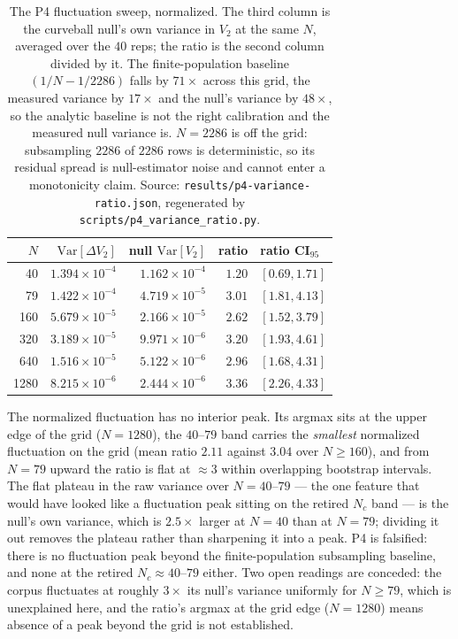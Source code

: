 \documentclass[11pt,a4paper]{article}
\theoremstyle{plain}
\theoremstyle{remark}
\theoremstyle{plain}
\begin{document}
\begin{table}[h]\centering\small
\begin{tabular}{rrrrl}
\toprule
$N$ & $\mathrm{Var}[\Delta V_2]$ & null $\mathrm{Var}[V_2]$ & ratio & ratio CI$_{95}$ \\
\midrule
40   & $1.394\times10^{-4}$ & $1.162\times10^{-4}$ & $1.20$ & $[0.69,1.71]$ \\
79   & $1.422\times10^{-4}$ & $4.719\times10^{-5}$ & $3.01$ & $[1.81,4.13]$ \\
160  & $5.679\times10^{-5}$ & $2.166\times10^{-5}$ & $2.62$ & $[1.52,3.79]$ \\
320  & $3.189\times10^{-5}$ & $9.971\times10^{-6}$ & $3.20$ & $[1.93,4.61]$ \\
640  & $1.516\times10^{-5}$ & $5.122\times10^{-6}$ & $2.96$ & $[1.68,4.31]$ \\
1280 & $8.215\times10^{-6}$ & $2.444\times10^{-6}$ & $3.36$ & $[2.26,4.33]$ \\
\bottomrule
\end{tabular}
\caption{The P4 fluctuation sweep, normalized. The third column is the curveball
null's own variance in $V_2$ at the same $N$, averaged over the $40$ reps; the
ratio is the second column divided by it. The finite-population baseline
$(1/N-1/2286)$ falls by $71\times$ across this grid, the measured variance by
$17\times$ and the null's variance by $48\times$, so the analytic baseline is not
the right calibration and the measured null variance is. $N=2286$ is off the
grid: subsampling $2286$ of $2286$ rows is deterministic, so its residual spread
is null-estimator noise and cannot enter a monotonicity claim. Source:
\texttt{results/p4-variance-ratio.json}, regenerated by
\texttt{scripts/p4\_variance\_ratio.py}.}
\label{tab:p4ratio}
\end{table}

The normalized fluctuation has no interior peak. Its argmax sits at the upper
edge of the grid ($N=1280$), the $40$--$79$ band carries the \emph{smallest}
normalized fluctuation on the grid (mean ratio $2.11$ against $3.04$ over
$N\ge160$), and from $N=79$ upward the ratio is flat at $\approx3$ within
overlapping bootstrap intervals. The flat plateau in the raw variance over
$N=40$--$79$ --- the one feature that would have looked like a fluctuation peak
sitting on the retired $N_c$ band --- is the null's own variance, which is
$2.5\times$ larger at $N=40$ than at $N=79$; dividing it out removes the
plateau rather than sharpening it into a peak. P4 is falsified: there is no fluctuation peak beyond the finite-population subsampling baseline, and none at the retired $N_c\approx40$--$79$ either. Two open readings are conceded: the corpus fluctuates at roughly $3\times$ its null's variance uniformly for $N\ge79$, which is unexplained here, and the ratio's argmax at the grid edge ($N=1280$) means absence of a peak beyond the grid is not established.
\end{document}
